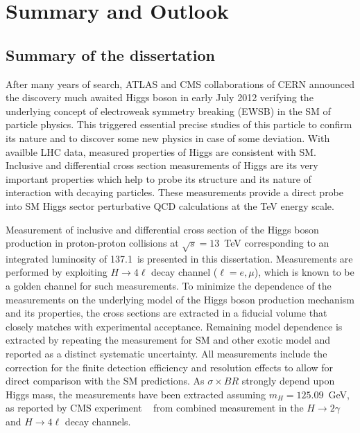 \chapter{Summary and Outlook}\label{Chapter7}
\section{Summary of the dissertation} \label{summary}
After many years of search, ATLAS and CMS collaborations of CERN announced the discovery much awaited Higgs boson in early July 2012 verifying the underlying concept of electroweak symmetry breaking (EWSB) in the SM of particle physics.
This triggered essential precise studies of this particle to confirm its nature and to discover some new physics in case of some deviation. With availble LHC data, measured properties of Higgs are consistent with SM. Inclusive and differential cross section measurements of Higgs are its very important properties which help to probe its structure and its nature of interaction with decaying particles. These measurements provide a direct probe into SM Higgs sector perturbative QCD calculations at the TeV energy scale.
\par Measurement of inclusive and differential cross section of the Higgs boson production in proton-proton 
collisions at $\sqrt{s}=13$~TeV corresponding to an integrated luminosity of 137.1~\ifb is presented in this dissertation. Measurements are performed by exploiting $H \rightarrow 4\ell$  decay channel ($\ell = e, \mu$), which is known to be a golden channel for such measurements. 
To minimize the dependence of the measurements on the 
underlying model of the Higgs boson production  mechanism and  its properties, the cross sections are extracted in a fiducial volume that closely matches
with experimental acceptance. Remaining model dependence is extracted by repeating the measurement for SM and other exotic model and reported as 
a distinct systematic uncertainty. 
All measurements include the correction for the finite detection efficiency and resolution effects to allow for direct comparison with the SM predictions. 
As $\sigma \times BR$ strongly depend upon Higgs mass, the measurements have been extracted assuming $m_H =  125.09$~GeV, as reported by CMS experiment ~\cite{Reference39} from combined measurement in the $H \rightarrow 2\gamma$ and $H \rightarrow 4\ell$ decay channels. 

